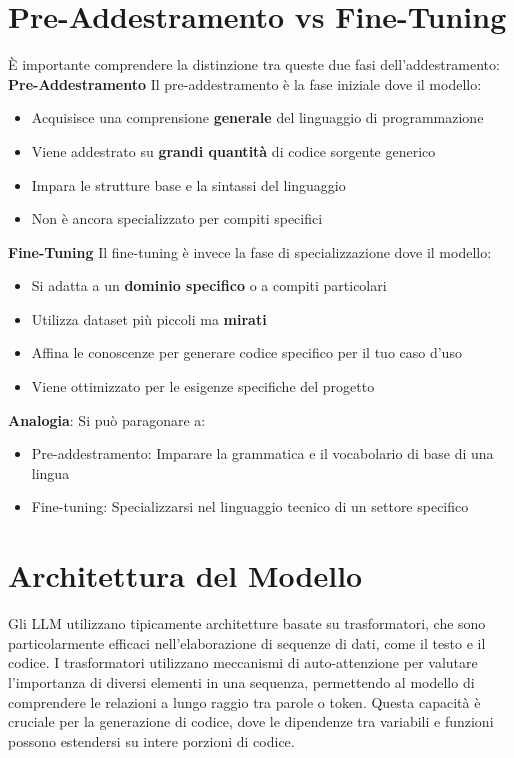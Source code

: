 \documentclass[12pt,a4paper,openright,twoside]{book}
\begin{document}
\section{Pre-Addestramento vs Fine-Tuning}
È importante comprendere la distinzione tra queste due fasi dell'addestramento:
\textbf{Pre-Addestramento}\newline
Il pre-addestramento è la fase iniziale dove il modello:
\begin{itemize}
    \item Acquisisce una comprensione \textbf{generale} del linguaggio di programmazione
    \item Viene addestrato su \textbf{grandi quantità} di codice sorgente generico
    \item Impara le strutture base e la sintassi del linguaggio
    \item Non è ancora specializzato per compiti specifici
\end{itemize}

\textbf{Fine-Tuning}\newline
Il fine-tuning è invece la fase di specializzazione dove il modello:
\begin{itemize}
    \item Si adatta a un \textbf{dominio specifico} o a compiti particolari
    \item Utilizza dataset più piccoli ma \textbf{mirati}
    \item Affina le conoscenze per generare codice specifico per il tuo caso d'uso
    \item Viene ottimizzato per le esigenze specifiche del progetto
\end{itemize}

\textbf{Analogia}: Si può paragonare a:
\begin{itemize}
    \item Pre-addestramento: Imparare la grammatica e il vocabolario di base di una lingua
    \item Fine-tuning: Specializzarsi nel linguaggio tecnico di un settore specifico
\end{itemize}

\section{Architettura del Modello}
Gli LLM utilizzano tipicamente architetture basate su trasformatori, che sono particolarmente efficaci nell'elaborazione di sequenze di dati, come il testo e il codice. I trasformatori utilizzano meccanismi di auto-attenzione per valutare l'importanza di diversi elementi in una sequenza, permettendo al modello di comprendere le relazioni a lungo raggio tra parole o token. Questa capacità è cruciale per la generazione di codice, dove le dipendenze tra variabili e funzioni possono estendersi su intere porzioni di codice.
\end{document}

